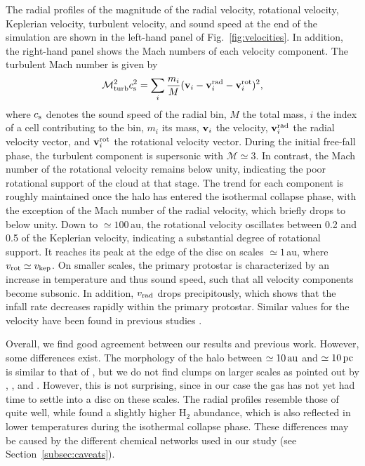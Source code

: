 \documentclass[useAMS,usenatbib]{mnras}
\newcommand{\HH}{\text{H}_2}          %
\newcommand{\cs}{c_{\rm s}}
\newcommand{\vrot}{v_{\rm rot}}
\newcommand{\vrad}{v_{\rm rad}}
\newcommand{\vkep}{v_{\rm kep}}
\begin{document}
The radial profiles of the magnitude of the radial velocity, rotational velocity, Keplerian velocity, turbulent velocity, and sound speed at the end of the simulation are shown in the left-hand panel of Fig.~\ref{fig:velocities}. In addition, the right-hand panel shows the Mach numbers of each velocity component. The turbulent Mach number is given by
\begin{equation}
\mathcal{M}_{\rm turb}^2\cs^2 = \sum_{i} {m_i \over M} ({\bf v}_i - {\bf v}^{\rm rad}_i - {\bf v}^{\rm rot}_i)^2,
\label{eq:turb}
\end{equation}
where $\cs$ denotes the sound speed of the radial bin, $M$ the total mass, $i$ the index of a cell contributing to the bin, $m_i$ its mass, ${\bf v}_i$ the velocity, ${\bf v}^{\rm rad}_i $ the radial velocity vector, and ${\bf v}^{\rm rot}_i$ the rotational velocity vector. During the initial free-fall phase, the turbulent component is supersonic with $\mathcal{M}\simeq 3$. In contrast, the Mach number of the rotational velocity remains below unity, indicating the poor rotational support of the cloud at that stage. The trend for each component is roughly maintained once the halo has entered the isothermal collapse phase, with the exception of the Mach number of the radial velocity, which briefly drops to below unity. Down to $\simeq 100\,$au, the rotational velocity oscillates between 0.2 and 0.5 of the Keplerian velocity, indicating a substantial degree of rotational support. It reaches its peak at the edge of the disc on scales $\simeq 1\,$au, where $\vrot\simeq \vkep$. On smaller scales, the primary protostar is characterized by an increase in temperature and thus sound speed, such that all velocity components become subsonic. In addition, $\vrad$ drops precipitously, which shows that the infall rate decreases rapidly within the primary protostar. Similar values for the velocity have been found in previous studies \citep[e.g.][]{Regan_2014a}.

Overall, we find good agreement between our results and previous work. However, some differences exist. The morphology of the halo between $\simeq 10\,{\rm au}$ and $\simeq 10\,{\rm pc}$ is similar to that of \citet{Inayoshi_2014}, but we do not find clumps on larger scales as pointed out by \citet{Regan_2009}, \citet{Latif_2013a}, and \citet{Regan_2014a}. However, this is not surprising, since in our case the gas has not yet had time to settle into a disc on these scales. The radial profiles resemble those of \citet{Latif_2013a} quite well, while \citet{Inayoshi_2014} found a slightly higher $\HH$ abundance, which is also reflected in lower temperatures during the isothermal collapse phase. These differences may be caused by the different chemical networks used in our study (see Section~\ref{subsec:caveats}).
\end{document}
